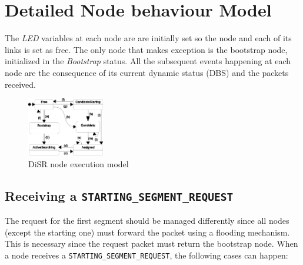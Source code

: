 \section{Detailed Node behaviour Model}
\label{sec:disr_detailed_model}

The \emph{LED} variables at each node are are initially set so the node and
each of its links is set as free. The only node that makes exception
is the bootstrap node, initialized in the \emph{Bootstrap} status. All
the subsequent events happening at each node are the consequence of
its current dynamic status (DBS) and the packets received.

\begin{figure}
  \centering
    \includegraphics[width=0.30\textwidth]{pictures/state_machine.eps}
  \caption{DiSR node execution model}
  \label{fig:dna_tag}
\end{figure}



\subsection{Receiving a \texttt{STARTING\_SEGMENT\_REQUEST}}

The request for the first segment should be managed differently since
all nodes (except the starting one) must forward the packet using a
flooding mechanism. This is necessary since the request packet must
return the bootstrap node.
When a node receives a \texttt{STARTING\_SEGMENT\_REQUEST}, the
following cases can happen:

